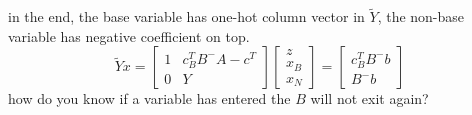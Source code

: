 \documentclass[11pt, oneside]{article}   	%
\begin{document}
in the end, the base variable has one-hot column vector in $\tilde{Y}$, the non-base variable has negative coefficient on top.
\[
\tilde{Y} x=  \begin{bmatrix} 
	1 & c^T_B B^- A-c^T \\
	0 & Y
	\end{bmatrix}\begin{bmatrix} 
	z \\ x_B \\ x_N
	\end{bmatrix} = \begin{bmatrix} 
	 c^T_B B^- b \\
	B^{-}b
	\end{bmatrix}
\]
how do you know if a variable has entered the $B$ will not exit again? 
\end{document}
